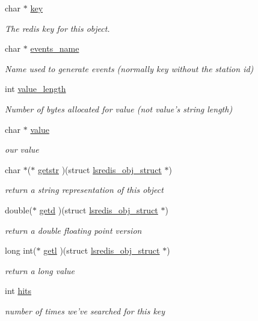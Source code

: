 \begin{DoxyCompactItemize}
char $\ast$ \hyperlink{structlsredis__obj__struct_aa8c5a453b9424e5666320b8675a42f5c}{key}
\begin{DoxyCompactList}\small\item\em The redis key for this object. \end{DoxyCompactList}\item 
char $\ast$ \hyperlink{structlsredis__obj__struct_ad0a987a011b580eab739cda831f78fbb}{events\-\_\-name}
\begin{DoxyCompactList}\small\item\em Name used to generate events (normally key without the station id) \end{DoxyCompactList}\item 
int \hyperlink{structlsredis__obj__struct_a664f0eaafb8dffc0dbde126e0340efb9}{value\-\_\-length}
\begin{DoxyCompactList}\small\item\em Number of bytes allocated for value (not value's string length) \end{DoxyCompactList}\item 
char $\ast$ \hyperlink{structlsredis__obj__struct_a0465c65288e8101805a6f91049164517}{value}
\begin{DoxyCompactList}\small\item\em our value \end{DoxyCompactList}\item 
char $\ast$($\ast$ \hyperlink{structlsredis__obj__struct_aa61ab86f719e093af48810a3bd37b739}{getstr} )(struct \hyperlink{structlsredis__obj__struct}{lsredis\-\_\-obj\-\_\-struct} $\ast$)
\begin{DoxyCompactList}\small\item\em return a string representation of this object \end{DoxyCompactList}\item 
double($\ast$ \hyperlink{structlsredis__obj__struct_a6e8586747a0453b16e5b5104c41eab76}{getd} )(struct \hyperlink{structlsredis__obj__struct}{lsredis\-\_\-obj\-\_\-struct} $\ast$)
\begin{DoxyCompactList}\small\item\em return a double floating point version \end{DoxyCompactList}\item 
long int($\ast$ \hyperlink{structlsredis__obj__struct_abcb9459a7d8edabaf8ff4e9f1a96aba7}{getl} )(struct \hyperlink{structlsredis__obj__struct}{lsredis\-\_\-obj\-\_\-struct} $\ast$)
\begin{DoxyCompactList}\small\item\em return a long value \end{DoxyCompactList}\item 
int \hyperlink{structlsredis__obj__struct_a43fcbff584654ab086d973ce34cb6ddc}{hits}
\begin{DoxyCompactList}\small\item\em number of times we've searched for this key \end{DoxyCompactList}\end{DoxyCompactItemize}


